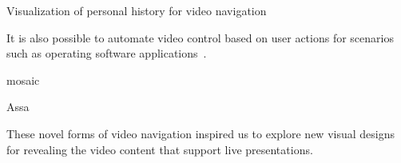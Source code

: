 Visualization of personal history for video navigation~\cite{Al-Hajri:2014:VPH:2611105.2557106}

It is also possible to automate video control based on user actions for scenarios such as operating software applications~\cite{Pongnumkul:2011ju}.

mosaic

Assa \ea{} ~\cite{assa2005action,assa2008motion}


These novel forms of video navigation inspired us to explore new visual designs for revealing the video content that support live presentations.

